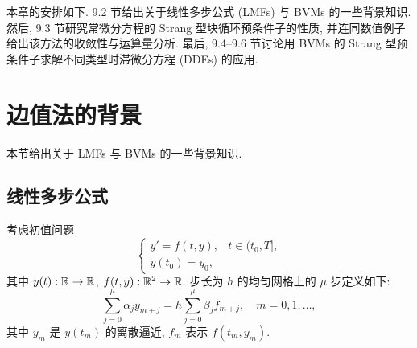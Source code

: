 本章的安排如下. 9.2 节给出关于线性多步公式 (LMFs) 与 BVMs 的一些背景知识. 然后, 9.3 节研究常微分方程的 Strang 型块循环预条件子的性质, 并连同数值例子给出该方法的收敛性与运算量分析. 最后, 9.4–9.6 节讨论用 BVMs 的 Strang 型预条件子求解不同类型时滞微分方程 (DDEs) 的应用.

\section{边值法的背景}
\label{sec:9-2}

本节给出关于 LMFs 与 BVMs 的一些背景知识.

\subsection{线性多步公式}
\label{sec:9-2-1}

考虑初值问题
\[
  \left\{
  \begin{array}{ll}
    y'=f(t,y), & t\in(t_0,T],\\
    y(t_0)=y_0,
  \end{array}
  \right.
\]
其中 $y(t):\mathbb{R}\to\mathbb{R}$, $f(t,y):\mathbb{R}^2\to\mathbb{R}$. 步长为 $h$ 的均匀网格上的 $\mu$ 步定义如下:
\begin{equation}
  \sum_{j=0}^{\mu}\alpha_jy_{m+j}=h\sum_{j=0}^{\mu}\beta_jf_{m+j},\quad m=0,1,\ldots,
  \label{eq:9-2}
\end{equation}
其中 $y_m$ 是 $y(t_m)$ 的离散逼近, $f_m$ 表示 $f(t_m,y_m)$.

